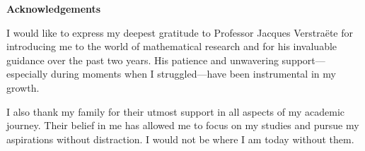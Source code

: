 \begin{center}
  \textbf{\Large Acknowledgements}
\end{center}

\vspace{0.5cm}

I would like to express my deepest gratitude to Professor Jacques Verstraëte for introducing me to the world of mathematical research and for his invaluable guidance over the past two years. His patience and unwavering support—especially during moments when I struggled—have been instrumental in my growth.

I also thank my family for their utmost support in all aspects of my academic journey. Their belief in me has allowed me to focus on my studies and pursue my aspirations without distraction. I would not be where I am today without them.